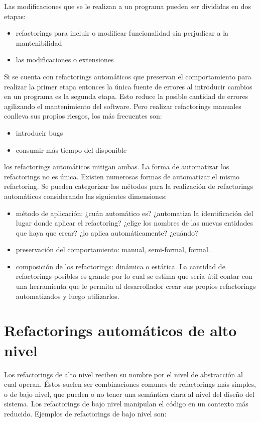 Las modificaciones que se le realizan a un programa pueden ser divididas en dos etapas:

\begin{itemize}
    \item refactorings para incluir o modificar funcionalidad sin perjudicar a la mantenibilidad
    \item las modificaciones o extensiones
\end{itemize}

Si se cuenta con refactorings automáticos que preservan el comportamiento para realizar la primer
etapa entonces la única fuente de errores al introducir cambios en un programa es la segunda etapa.
Esto reduce la posible cantidad de errores agilizando el mantenimiento del software. Pero realizar
refactorings manuales conlleva sus propios riesgos, los más frecuentes son:

\begin{itemize}
    \item introducir bugs
    \item consumir más tiempo del disponible
\end{itemize}

los refactorings automáticos mitigan ambas. La forma de automatizar los refactorings no es única. Existen
numerosas formas de automatizar el mismo refactoring. Se pueden categorizar los métodos para la realización
de refactorings automáticos considerando las siguientes dimensiones:

\begin{itemize}
    \item método de aplicación: ¿cuán automático es? ¿automatiza la identificación del lugar donde
    aplicar el refactoring? ¿elige los nombres de las nuevas entidades que haya que crear? ¿lo
    aplica automáticamente? ¿cuándo?
    \item preservación del comportamiento: manual, semi-formal, formal.
    \item composición de los refactorings: dinámica o estática. La cantidad de refactorings posibles
es grande por lo cual se estima que sería útil contar con una herramienta que le permita al
desarrollador crear sus propios refactorings automatizados y luego utilizarlos.
\end{itemize}



\section{Refactorings automáticos de alto nivel}
Los refactorings de alto nivel reciben su nombre por el nivel de abstracción al cual operan. Éstos
suelen ser combinaciones comunes de refactorings más simples, o de bajo nivel, que pueden o no tener
una semántica clara al nivel del diseño del sistema. Los refactorings de bajo nivel manipulan el código en
un contexto más reducido. Ejemplos de refactorings de bajo nivel son:

